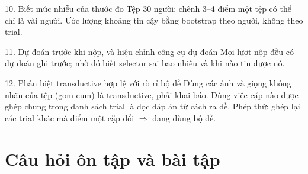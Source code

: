 \documentclass[11pt,a4paper,oneside]{report}
\begin{document}
\begin{principle}{10. Biết mức nhiễu của thước đo}
Tệp 30 người: chênh 3--4 điểm một tệp có thể chỉ là vài người. Ước lượng khoảng tin cậy bằng bootstrap theo người, không theo trial.
\end{principle}

\begin{principle}{11. Dự đoán trước khi nộp, và hiệu chỉnh công cụ dự đoán}
Mọi lượt nộp đều có dự đoán ghi trước; nhờ đó biết selector sai bao nhiêu và khi nào tin được nó.
\end{principle}

\begin{principle}{12. Phân biệt transductive hợp lệ với rò rỉ bộ đề}
Dùng các ảnh và giọng không nhãn của tệp (gom cụm) là transductive, phải khai báo. Dùng việc cặp nào được ghép chung trong danh sách trial là đọc đáp án từ cách ra đề. Phép thử: ghép lại các trial khác mà điểm một cặp đổi $\Rightarrow$ đang dùng bộ đề.
\end{principle}

\section{Câu hỏi ôn tập và bài tập}
\label{sec:exercises}
\end{document}
